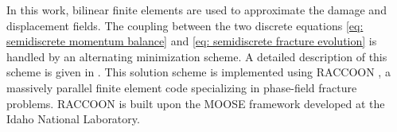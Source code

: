 In this work, bilinear finite elements are used to approximate the damage and displacement fields. 
The coupling between the two discrete equations \ref{eq: semidiscrete momentum balance} and \ref{eq: semidiscrete fracture evolution} is handled by an alternating minimization scheme. A detailed description of this scheme is given in \cite{hu2020phase}.  {\color{blue} This solution scheme is implemented using RACCOON \cite{raccoon}, a massively parallel finite element code specializing in phase-field fracture problems. RACCOON is built upon the MOOSE framework \cite{gaston2009moose, permann2020moose} developed at the Idaho National Laboratory.}

